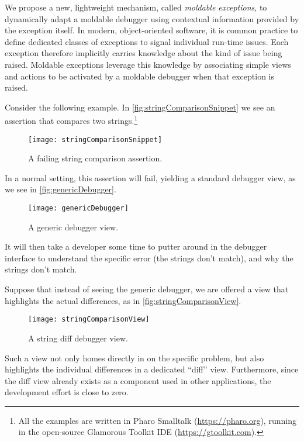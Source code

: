 \documentclass[sigplan,anonymous,review,10pt]{acmart}
\newcommand\ac[1]{\nbc{AC}{#1}{teal}}
\begin{document}

We propose a new, lightweight mechanism, called \emph{moldable exceptions}, to dynamically adapt a moldable debugger using contextual information provided by the exception itself.
In modern, object-oriented software, it is common practice to define dedicated classes of exceptions to signal individual run-time issues.
Each exception therefore implicitly carries knowledge about the kind of issue being raised.
Moldable exceptions leverage this knowledge by associating simple views and actions to be activated by a moldable debugger when that exception is raised.

Consider the following example.
In \autoref{fig:stringComparisonSnippet} we see an assertion that compares two strings.\footnote{All the examples are written in Pharo Smalltalk (\url{https://pharo.org}), running in the open-source Glamorous Toolkit IDE (\url{https://gtoolkit.com}).}
\begin{figure}[h]
  \texttt{[image: stringComparisonSnippet]}
  \caption{A failing string comparison assertion.}
  \label{fig:stringComparisonSnippet}
\end{figure}
In a normal setting, this assertion will fail, yielding a standard debugger view, as we see in \autoref{fig:genericDebugger}.
\begin{figure}[h]
  \texttt{[image: genericDebugger]}
  \caption{A generic debugger view.}
  \label{fig:genericDebugger}
\end{figure}
It will then take a developer some time to putter around in the debugger interface to understand the specific error (the strings don't match), and why the strings don't match.

Suppose that instead of seeing the generic debugger, we are offered a view that highlights the actual differences, as in \autoref{fig:stringComparisonView}.
\begin{figure}[h]
  \texttt{[image: stringComparisonView]}
  \caption{A string diff debugger view.}
  \label{fig:stringComparisonView}
\end{figure}
Such a view not only homes directly in on the specific problem, but also highlights the individual differences in a dedicated ``diff'' view.
Furthermore, since the diff view already exists as a component used in other applications, the development effort is close to zero.
\end{document}
